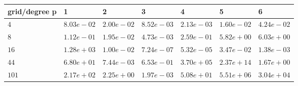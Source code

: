 \begin{tabular}{lllllll}
\hline
 grid/degree p   & 1          & 2          & 3          & 4          & 5          & 6          \\
\hline
 $4$             & $8.03e-02$ & $2.00e-02$ & $8.52e-03$ & $2.13e-03$ & $1.60e-02$ & $4.24e-02$ \\
 $8$             & $1.12e-01$ & $1.95e-02$ & $4.73e-03$ & $2.59e-01$ & $5.82e+00$ & $6.03e+00$ \\
 $16$            & $1.28e+03$ & $1.00e-02$ & $7.24e-07$ & $5.32e-05$ & $3.47e-02$ & $1.38e-03$ \\
 $44$            & $6.80e+01$ & $7.44e-03$ & $6.53e-01$ & $3.70e+05$ & $2.37e+14$ & $1.67e+00$ \\
 $101$           & $2.17e+02$ & $2.25e+00$ & $1.97e-03$ & $5.08e+01$ & $5.51e+06$ & $3.04e+04$ \\
\hline
\end{tabular}